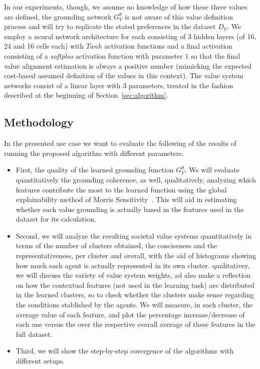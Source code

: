 \documentclass{ecai}
\begin{document}
In our experiments, though, we assume no knowledge of how these three values are defined, the grounding network $G_V^\theta$ is not aware of this value definition process and will try to replicate the stated preferences in the dataset $D_V$. We employ a neural network architecture for each consisting of 3 hidden layers (of 16, 24 and 16 cells each) with $Tanh$ activation functions and a final activation consisting of a \textit{softplus} activation function with parameter $1$ so that the final value alignment estimation is always a positive number (mimicking the expected cost-based assumed definition of the values in this context). The value system networks consist of a linear layer with $3$ parameters, treated in the fashion described at the beginning of Section~\ref{sec:algorithm}.

\subsection{Methodology}
In the presented use case we want to evaluate the following of the results of running the proposed algorithm with different parameters.
\begin{itemize}
    \item First, the quality of the learned grounding function $G_V^\theta$. We will evaluate quantitatively  the grounding coherence, as well, qualitatively, analyzing which features contribute the most to the learned function using the global explainability method of Morris Sensitivity~\cite{morrissensitivity1991}. This will aid in estimating whether each value grounding is actually based in the features used in the dataset for its calculation.
    \item Second, we will analyze the resulting societal value systems quantitatively in terms of the number of clusters obtained, the conciseness and the representativeness, per cluster and overall, with the aid of histograms showing how much each agent is actually represented in its own cluster. qualitativey, we will discuss the variety of value system weights, ad also make a reflection on how the contextual features (not used in the learning task) are distributed in the learned clusters, so to check whether the clusters make sense regarding the conditions stablished by the agents. We will measure, in each cluster, the average value of each feature, and plot the percentage increase/decrease of each one versus the over the respective overall average of these features in the full dataset.
    \item Third, we will show the step-by-step covergence of the algorithms with different setups. 
\end{itemize}
\end{document}

